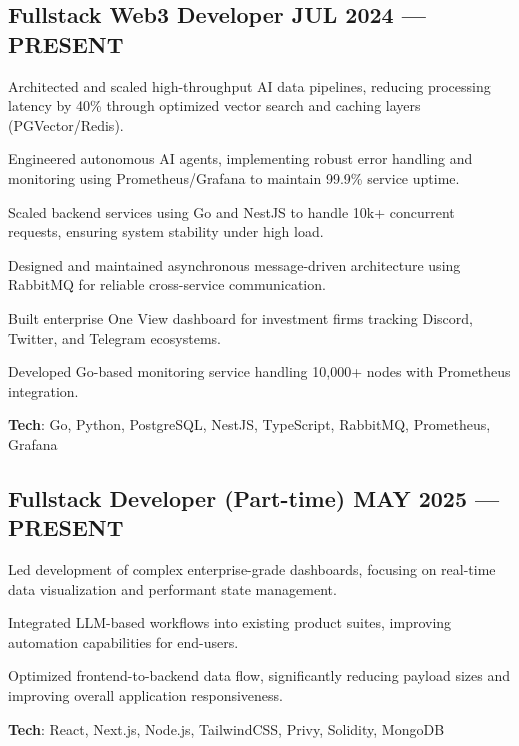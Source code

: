 \documentclass[letter,10pt]{article}
\begin{document}
\subsection{{Fullstack Web3 Developer \hfill JUL 2024 --- PRESENT}}
\begin{zitemize}
  \item Architected and scaled high-throughput AI data pipelines, reducing processing latency by 40\% through optimized vector search and caching layers (PGVector/Redis).
  \item Engineered autonomous AI agents, implementing robust error handling and monitoring using Prometheus/Grafana to maintain 99.9\% service uptime.
  \item Scaled backend services using Go and NestJS to handle 10k+ concurrent requests, ensuring system stability under high load.
  \item Designed and maintained asynchronous message-driven architecture using RabbitMQ for reliable cross-service communication.
  \item Built enterprise One View dashboard for investment firms tracking Discord, Twitter, and Telegram ecosystems.
  \item Developed Go-based monitoring service handling 10,000+ nodes with Prometheus integration.
  \item \textbf{Tech}: Go, Python, PostgreSQL, NestJS, TypeScript, RabbitMQ, Prometheus, Grafana
\end{zitemize}

\subsection{{Fullstack Developer (Part-time) \hfill MAY 2025 --- PRESENT}}
\begin{zitemize}
  \item Led development of complex enterprise-grade dashboards, focusing on real-time data visualization and performant state management.
  \item Integrated LLM-based workflows into existing product suites, improving automation capabilities for end-users.
  \item Optimized frontend-to-backend data flow, significantly reducing payload sizes and improving overall application responsiveness.
  \item \textbf{Tech}: React, Next.js, Node.js, TailwindCSS, Privy, Solidity, MongoDB
\end{zitemize}
\end{document}
